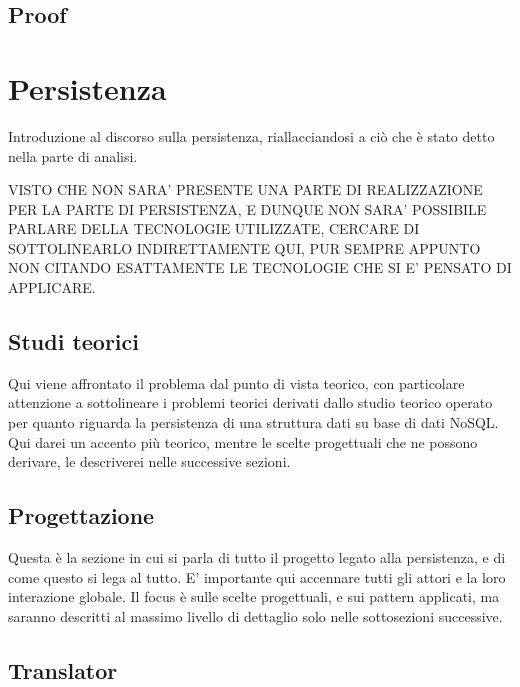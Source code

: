 	\subsection{Proof}
	
%		
	
\section{Persistenza}

	Introduzione al discorso sulla persistenza, riallacciandosi a ciò che è stato detto nella parte di analisi.
	
	VISTO CHE NON SARA' PRESENTE UNA PARTE DI REALIZZAZIONE PER LA PARTE DI PERSISTENZA, E DUNQUE
	NON SARA' POSSIBILE PARLARE DELLA TECNOLOGIE UTILIZZATE, CERCARE DI SOTTOLINEARLO INDIRETTAMENTE QUI,
	PUR SEMPRE APPUNTO NON CITANDO ESATTAMENTE LE TECNOLOGIE CHE SI E' PENSATO DI APPLICARE.
		
	\subsection{Studi teorici}
		
		Qui viene affrontato il problema dal punto di vista teorico, con particolare attenzione a sottolineare i problemi teorici derivati dallo studio 
		teorico operato per quanto riguarda la persistenza di una struttura dati su base di dati NoSQL. Qui darei un accento più teorico, mentre le 
		scelte progettuali che ne possono derivare, le descriverei nelle successive sezioni.
		
	\subsection{Progettazione}
	
	Questa è la sezione in cui si parla di tutto il progetto legato alla persistenza, e di come questo si lega al tutto.
	E' importante qui accennare tutti gli attori e la loro interazione globale. Il focus è sulle scelte progettuali, e sui
	pattern applicati, ma saranno descritti al massimo livello di dettaglio solo nelle sottosezioni successive.
		
	\subsection{Translator}
	
